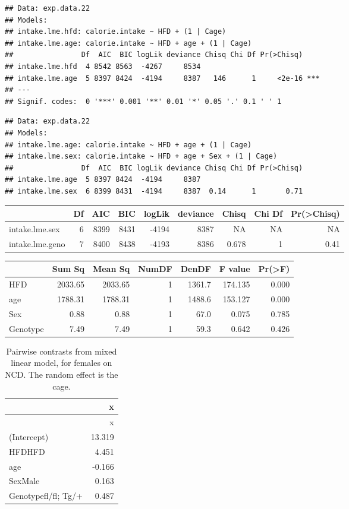 \documentclass[]{article}
\begin{document}
\begin{verbatim}
## Data: exp.data.22
## Models:
## intake.lme.hfd: calorie.intake ~ HFD + (1 | Cage)
## intake.lme.age: calorie.intake ~ HFD + age + (1 | Cage)
##                Df  AIC  BIC logLik deviance Chisq Chi Df Pr(>Chisq)    
## intake.lme.hfd  4 8542 8563  -4267     8534                            
## intake.lme.age  5 8397 8424  -4194     8387   146      1     <2e-16 ***
## ---
## Signif. codes:  0 '***' 0.001 '**' 0.01 '*' 0.05 '.' 0.1 ' ' 1
\end{verbatim}

\begin{verbatim}
## Data: exp.data.22
## Models:
## intake.lme.age: calorie.intake ~ HFD + age + (1 | Cage)
## intake.lme.sex: calorie.intake ~ HFD + age + Sex + (1 | Cage)
##                Df  AIC  BIC logLik deviance Chisq Chi Df Pr(>Chisq)
## intake.lme.age  5 8397 8424  -4194     8387                        
## intake.lme.sex  6 8399 8431  -4194     8387  0.14      1       0.71
\end{verbatim}

\begin{longtable}[]{@{}lrrrrrrrr@{}}
\toprule
& Df & AIC & BIC & logLik & deviance & Chisq & Chi Df &
Pr(\textgreater{}Chisq)\tabularnewline
\midrule
\endhead
intake.lme.sex & 6 & 8399 & 8431 & -4194 & 8387 & NA & NA &
NA\tabularnewline
intake.lme.geno & 7 & 8400 & 8438 & -4193 & 8386 & 0.678 & 1 &
0.41\tabularnewline
\bottomrule
\end{longtable}

\begin{longtable}[]{@{}lrrrrrr@{}}
\toprule
& Sum Sq & Mean Sq & NumDF & DenDF & F value &
Pr(\textgreater{}F)\tabularnewline
\midrule
\endhead
HFD & 2033.65 & 2033.65 & 1 & 1361.7 & 174.135 & 0.000\tabularnewline
age & 1788.31 & 1788.31 & 1 & 1488.6 & 153.127 & 0.000\tabularnewline
Sex & 0.88 & 0.88 & 1 & 67.0 & 0.075 & 0.785\tabularnewline
Genotype & 7.49 & 7.49 & 1 & 59.3 & 0.642 & 0.426\tabularnewline
\bottomrule
\end{longtable}

\begin{longtable}[]{@{}lr@{}}
\caption{Pairwise contrasts from mixed linear model, for females on NCD.
The random effect is the cage.}\tabularnewline
\toprule
& x\tabularnewline
\midrule
\endfirsthead
\toprule
& x\tabularnewline
\midrule
\endhead
(Intercept) & 13.319\tabularnewline
HFDHFD & 4.451\tabularnewline
age & -0.166\tabularnewline
SexMale & 0.163\tabularnewline
Genotypefl/fl; Tg/+ & 0.487\tabularnewline
\bottomrule
\end{longtable}
\end{document}
